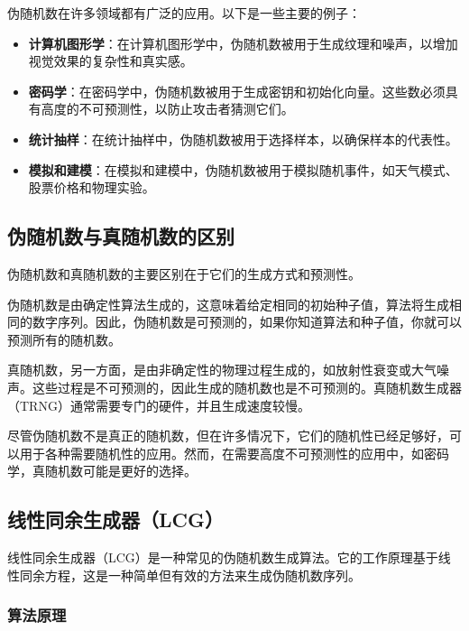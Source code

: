 \documentclass{ctexart}
\begin{document}
    伪随机数在许多领域都有广泛的应用。以下是一些主要的例子：

    \begin{itemize}
        \item \textbf{计算机图形学}：在计算机图形学中，伪随机数被用于生成纹理和噪声，以增加视觉效果的复杂性和真实感\cite{owen2003survey}。
        \item \textbf{密码学}：在密码学中，伪随机数被用于生成密钥和初始化向量。这些数必须具有高度的不可预测性，以防止攻击者猜测它们\cite{menezes2018handbook}。
        \item \textbf{统计抽样}：在统计抽样中，伪随机数被用于选择样本，以确保样本的代表性\cite{robert2004monte}。
        \item \textbf{模拟和建模}：在模拟和建模中，伪随机数被用于模拟随机事件，如天气模式、股票价格和物理实验\cite{robert2004monte}。
    \end{itemize}

    \subsection{伪随机数与真随机数的区别}

    伪随机数和真随机数的主要区别在于它们的生成方式和预测性。

    伪随机数是由确定性算法生成的，这意味着给定相同的初始种子值，算法将生成相同的数字序列。因此，伪随机数是可预测的，如果你知道算法和种子值，你就可以预测所有的随机数\cite{knuth1981art}。

    真随机数，另一方面，是由非确定性的物理过程生成的，如放射性衰变或大气噪声。这些过程是不可预测的，因此生成的随机数也是不可预测的。真随机数生成器（TRNG）通常需要专门的硬件，并且生成速度较慢\cite{holzinger2018machine}。

    尽管伪随机数不是真正的随机数，但在许多情况下，它们的随机性已经足够好，可以用于各种需要随机性的应用。然而，在需要高度不可预测性的应用中，如密码学，真随机数可能是更好的选择\cite{menezes2018handbook}。

\subsection{线性同余生成器（LCG）}

线性同余生成器（LCG）是一种常见的伪随机数生成算法。它的工作原理基于线性同余方程，这是一种简单但有效的方法来生成伪随机数序列。

\subsubsection{算法原理}
\end{document}

